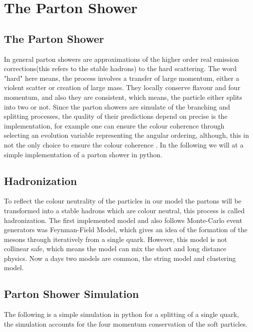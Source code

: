 \chapter{The Parton Shower}

\section{The Parton Shower}
In general parton showers are approximations of the higher order real emission corrections(this refers to the stable hadrons) to the hard scattering. The word "hard" here means,
the process involves a transfer of large momentum, either a violent scatter or creation of large mass. They locally conserve flavour and four momentum, and also they are consistent, which means, the particle either splits into two or not. 
Since the parton showers are simulate of the branching and splitting processes, the quality of their predictions depend on precise is the implementation, for example one can ensure the colour coherence through selecting an evolution variable representing the angular ordering, although, this in not the only choice to ensure the colour coherence \citep{introduction}.
In the following we will at a simple implementation of a parton shower in python.

\section{Hadronization}  

To reflect the colour neutrality of the particles in our model the partons will be transformed into a stable hadrons which are colour neutral, this process is called hadronization. The first implemented model and also follows Monte-Carlo event generators was Feynman-Field Model, which gives an idea of the formation of the mesons through iteratively from a single quark. However, this model is not collinear safe, which means the model can mix the short and long distance physics. Now a days two models are common, the string model and clustering model\citep{introduction}. 

\section{Parton Shower Simulation}

The following is a simple simulation in python for a splitting of a single quark, the simulation accounts for the four momentum conservation of the soft particles.

